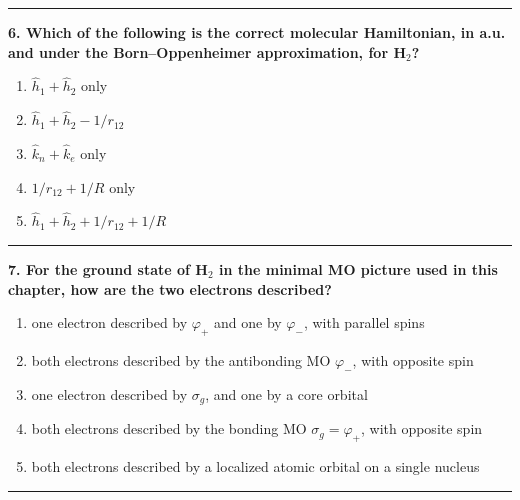\documentclass[
  english,
  9pt,
]{extbook}
\providecommand{\tightlist}{%
  \setlength{\itemsep}{0pt}\setlength{\parskip}{0pt}}
\theoremstyle{definition}
\theoremstyle{definition}
\theoremstyle{definition}
\theoremstyle{definition}
\theoremstyle{remark}
\begin{document}
\begin{center}\rule{0.5\linewidth}{0.5pt}\end{center}

\textbf{6. Which of the following is the correct molecular Hamiltonian, in a.u. and under the Born--Oppenheimer approximation, for H\(_2\)?}

\begin{enumerate}
\def\labelenumi{\alph{enumi}.}
\tightlist
\item
  \(\hat{h}_1 + \hat{h}_2\) only\\
\item
  \(\hat{h}_1 + \hat{h}_2 - 1/r_{12}\)\\
\item
  \(\hat{k}_n + \hat{k}_e\) only\\
\item
  \(1/r_{12} + 1/R\) only\\
\item
  \(\hat{h}_1 + \hat{h}_2 + 1/r_{12} + 1/R\)
\end{enumerate}

\begin{center}\rule{0.5\linewidth}{0.5pt}\end{center}

\textbf{7. For the ground state of H\(_2\) in the minimal MO picture used in this chapter, how are the two electrons described?}

\begin{enumerate}
\def\labelenumi{\alph{enumi}.}
\tightlist
\item
  one electron described by \(\varphi_+\) and one by \(\varphi_-\), with parallel spins\\
\item
  both electrons described by the antibonding MO \(\varphi_-\), with opposite spin\\
\item
  one electron described by \(\sigma_g\), and one by a core orbital\\
\item
  both electrons described by the bonding MO \(\sigma_g = \varphi_+\), with opposite spin\\
\item
  both electrons described by a localized atomic orbital on a single nucleus
\end{enumerate}

\begin{center}\rule{0.5\linewidth}{0.5pt}\end{center}
\end{document}
